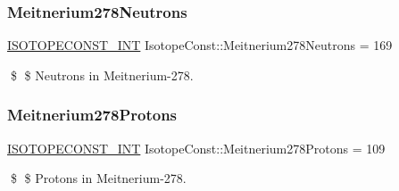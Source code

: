 \subsubsection{\texorpdfstring{Meitnerium278\+Neutrons}{Meitnerium278Neutrons}}
{\footnotesize\ttfamily \mbox{\hyperlink{group___isotope_const-_macros_ga5f18360b3e99483a35c32d789e62621c}{I\+S\+O\+T\+O\+P\+E\+C\+O\+N\+S\+T\+\_\+\+I\+NT}} Isotope\+Const\+::\+Meitnerium278\+Neutrons = 169}

\$ \$ Neutrons in Meitnerium-\/278. \mbox{\label{group___isotope_const-_meitnerium-_mt278_gab908dd47e66181d7f85729cc789b4202}} 
\subsubsection{\texorpdfstring{Meitnerium278\+Protons}{Meitnerium278Protons}}
{\footnotesize\ttfamily \mbox{\hyperlink{group___isotope_const-_macros_ga5f18360b3e99483a35c32d789e62621c}{I\+S\+O\+T\+O\+P\+E\+C\+O\+N\+S\+T\+\_\+\+I\+NT}} Isotope\+Const\+::\+Meitnerium278\+Protons = 109}

\$ \$ Protons in Meitnerium-\/278. 